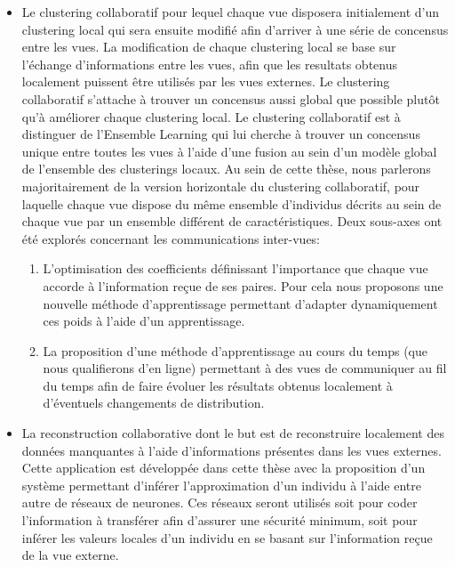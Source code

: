 \documentclass[a4paper]{article}
\begin{document}
\begin{itemize}
    \item Le clustering collaboratif pour lequel chaque vue disposera initialement d'un clustering local qui sera ensuite modifié afin d'arriver à une série de concensus entre les vues. La modification de chaque clustering local se base sur l'échange d'informations entre les vues, afin que les resultats obtenus localement puissent être utilisés par les vues externes. Le clustering collaboratif s'attache à trouver un concensus aussi global que possible plutôt qu'à améliorer chaque clustering local. Le clustering collaboratif est à distinguer de l'Ensemble Learning qui lui cherche à trouver un concensus unique entre toutes les vues à l'aide d'une fusion au sein d'un modèle global de l'ensemble des clusterings locaux. Au sein de cette thèse, nous parlerons majoritairement de la version horizontale du clustering collaboratif, pour laquelle chaque vue dispose du même ensemble d'individus décrits au sein de chaque vue par un ensemble différent de caractéristiques. Deux sous-axes ont été explorés concernant les communications inter-vues:
        \begin{enumerate}
            \item L'optimisation des coefficients définissant l'importance que chaque vue accorde à l'information reçue de ses paires. Pour cela nous proposons une nouvelle méthode d'apprentissage permettant d'adapter dynamiquement ces poids à l'aide d'un apprentissage.
            \item La proposition d'une méthode d'apprentissage au cours du temps (que nous qualifierons d'en ligne) permettant à des vues de communiquer au fil du temps afin de faire évoluer les résultats obtenus localement à d'éventuels changements de distribution.
        \end{enumerate}

    \item La reconstruction collaborative dont le but est de reconstruire localement des données manquantes à l'aide d'informations présentes dans les vues externes. Cette application est développée dans cette thèse avec la proposition d'un système permettant d'inférer l'approximation d'un individu à l'aide entre autre de réseaux de neurones. Ces réseaux seront utilisés soit pour coder l'information à transférer afin d'assurer une sécurité minimum, soit pour inférer les valeurs locales d'un individu en se basant sur l'information reçue de la vue externe.
\end{itemize}
\end{document}
